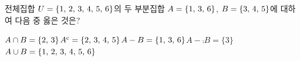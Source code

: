전체집합 $U=\{1,\mkern3mu 2,\mkern3mu 3,\mkern3mu 4,\mkern3mu 5,\mkern3mu 6\}$의 두 부분집합 $A=\{1,\mkern3mu 3,\mkern3mu 6\}$, $B=\{3,\mkern3mu 4,\mkern3mu 5\}$에 대하여 다음 중 옳은 것은?
\begin{choicesii}{$A\cap B=\{2,\mkern3mu 3\}$}{${A}^{\mathrm{c}}=\{2,\mkern3mu 3,\mkern3mu 4,\mkern3mu 5\}$}{$A-B=\{1,\mkern3mu 3,\mkern3mu 6\}$}{$A-\comp{B}=\{3\}$}{$A\cup B=\{1,\mkern3mu 2,\mkern3mu 3,\mkern3mu 4,\mkern3mu 5,\mkern3mu 6\}$}\end{choicesii}
